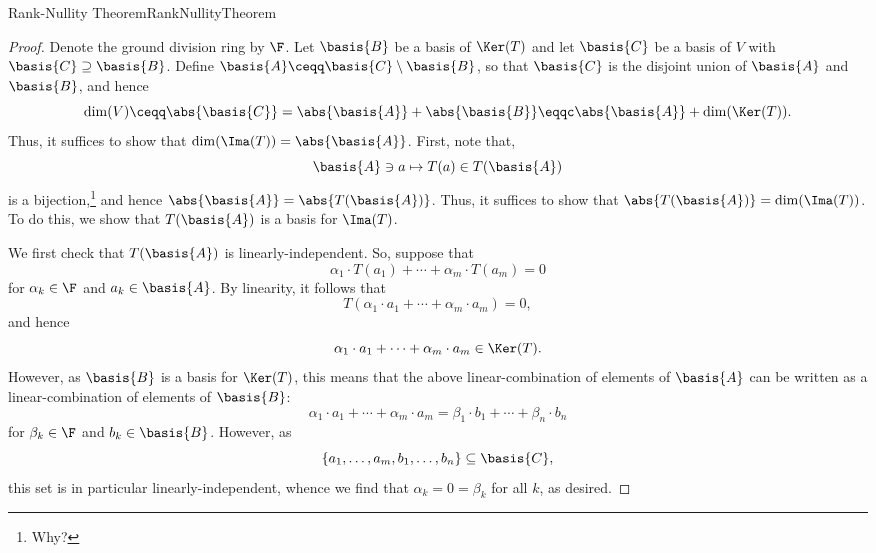 \begin{thm}{Rank-Nullity Theorem}{RankNullityTheorem}
	\begin{proof}
		Denote the ground division ring by $\F$.  Let $\basis{B}$ be a basis of $\Ker (T)$ and let $\basis{C}$ be a basis of $V$ with $\basis{C}\supseteq \basis{B}$.  Define $\basis{A}\ceqq \basis{C}\setminus \basis{B}$, so that $\basis{C}$ is the disjoint union of $\basis{A}$ and $\basis{B}$, and hence
		\begin{equation}
			\dim (V)\ceqq \abs{\basis{C}}=\abs{\basis{A}}+\abs{\basis{B}}\eqqc \abs{\basis{A}}+\dim (\Ker (T)).
		\end{equation}
		Thus, it suffices to show that $\dim (\Ima (T))=\abs{\basis{A}}$.  First, note that,
		\begin{equation}
			\basis{A}\ni a\mapsto T(a)\in T(\basis{A})
		\end{equation}
		is a bijection,\footnote{Why?} and hence $\abs{\basis{A}}=\abs{T(\basis{A})}$.  Thus, it suffices to show that $\abs{T(\basis{A})}=\dim (\Ima (T))$.  To do this, we show that $T(\basis{A})$ is a basis for $\Ima (T)$.
		
		We first check that $T(\basis{A})$ is linearly-independent.  So, suppose that
		\begin{equation}
			\alpha _1\cdot T(a_1)+\cdots +\alpha _m\cdot T(a_m)=0
		\end{equation}
		for $\alpha _k\in \F$ and $a_k\in \basis{A}$.  By linearity, it follows that
		\begin{equation}
			T(\alpha _1\cdot a_1+\cdots +\alpha _m\cdot a_m)=0,
		\end{equation}
		and hence
		\begin{equation}
			\alpha _1\cdot a_1+\cdots +\alpha _m\cdot a_m\in \Ker (T).
		\end{equation}
		However, as $\basis{B}$ is a basis for $\Ker (T)$, this means that the above linear-combination of elements of $\basis{A}$ can be written as a linear-combination of elements of $\basis{B}$:
		\begin{equation}
			\alpha _1\cdot a_1+\cdots +\alpha _m\cdot a_m=\beta _1\cdot b_1+\cdots +\beta _n\cdot b_n
		\end{equation}
		for $\beta _k\in \F$ and $b_k\in \basis{B}$.  However, as
		\begin{equation}
			\{ a_1,\ldots ,a_m,b_1,\ldots ,b_n\} \subseteq \basis{C},
		\end{equation}
		this set is in particular linearly-independent, whence we find that $\alpha _k=0=\beta _k$ for all $k$, as desired.
		

\end{proof}
\end{thm}
